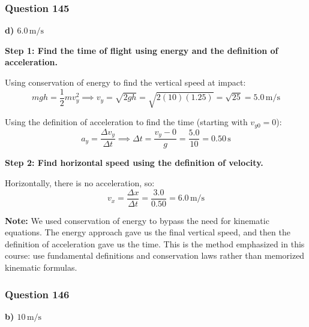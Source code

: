 \documentclass[12pt,letterpaper]{article}
\begin{document}
\subsubsection*{Question 145}

\begin{answerbox}
\textbf{d) $6.0\,\text{m/s}$}
\end{answerbox}

\begin{explanationbox}
\textbf{Step 1: Find the time of flight using energy and the definition of acceleration.}

Using conservation of energy to find the vertical speed at impact:
\[
mgh = \frac{1}{2}mv_y^2 \implies v_y = \sqrt{2gh} = \sqrt{2(10)(1.25)} = \sqrt{25} = 5.0\,\text{m/s}
\]

Using the definition of acceleration to find the time (starting with $v_{y0} = 0$):
\[
a_y = \frac{\Delta v_y}{\Delta t} \implies \Delta t = \frac{v_y - 0}{g} = \frac{5.0}{10} = 0.50\,\text{s}
\]

\textbf{Step 2: Find horizontal speed using the definition of velocity.}

Horizontally, there is no acceleration, so:
\[
v_x = \frac{\Delta x}{\Delta t} = \frac{3.0}{0.50} = 6.0\,\text{m/s}
\]

\textbf{Note:} We used conservation of energy to bypass the need for kinematic equations. The energy approach gave us the final vertical speed, and then the definition of acceleration gave us the time. This is the method emphasized in this course: use fundamental definitions and conservation laws rather than memorized kinematic formulas.
\end{explanationbox}

\subsubsection*{Question 146}

\begin{answerbox}
\textbf{b) $10\,\text{m/s}$}
\end{answerbox}
\end{document}
